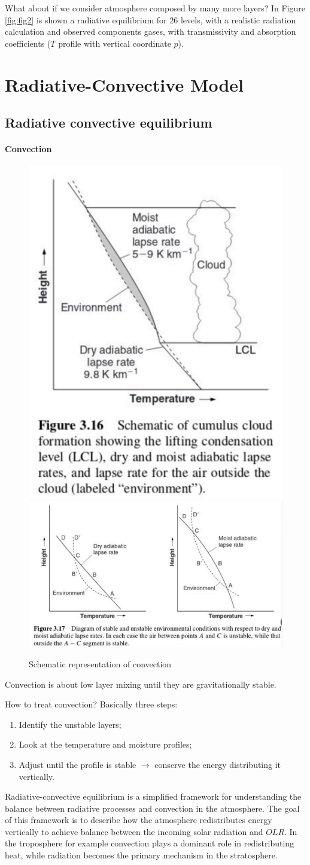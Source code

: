 What about if we consider atmosphere composed by many more layers? 
In Figure \ref{fig:fig2} is shown a radiative equilibrium for 26 levels, with a realistic radiation calculation and observed components gases, with transmissivity and absorption coefficients ($T$ profile with vertical coordinate $p$).

\section{Radiative-Convective Model}
\subsection{Radiative convective equilibrium}\label{subsec:convection adjustments}
\paragraph{Convection}
\begin{figure}[htpb]
    \centering
    \includegraphics[width=0.28\linewidth]{uploads/Screenshot 2024-11-20 130640.png}\quad \includegraphics[width=0.5\linewidth]{uploads/Screenshot 2024-11-20 130727.png}
    \caption{Schematic representation of convection}
 
\end{figure}
Convection is about low layer mixing until they are gravitationally stable.

How to treat convection? Basically three steps:
\begin{enumerate}
    \item Identify the unstable layers;
    \item Look at the temperature and moisture profiles;
    \item Adjust until the profile is stable $\rightarrow$ conserve the energy distributing it vertically.
\end{enumerate}
Radiative-convective equilibrium is a simplified framework for understanding the balance between radiative processes and convection in the atmosphere. The goal of this framework is to describe how the atmosphere redistributes energy vertically to achieve balance between the incoming solar radiation and $OLR$. In the troposphere for example convection plays a dominant role in redistributing heat, while radiation becomes the primary mechanism in the stratosphere. 


